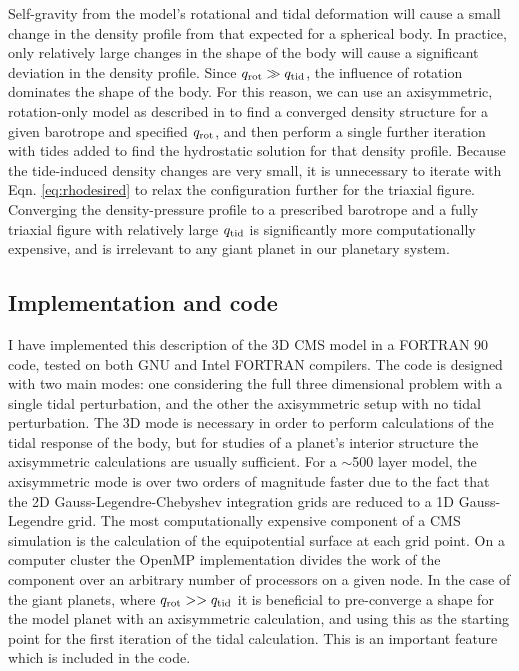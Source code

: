 Self-gravity from the model's rotational and tidal deformation will cause a small
change in the density profile from that expected for a spherical body.  In practice,
only relatively large changes in the shape of the body will cause a significant
deviation in the density profile. Since $q_{\rm rot} \gg q_{\rm tid}$, the influence
of rotation dominates the shape of the body. For this reason, we can use an
axisymmetric, rotation-only model as described in \citet{hubbard2013} to find a
converged density structure for a given barotrope and specified $q_{\rm rot}$, and
then perform a single further iteration with tides added to find the hydrostatic
solution for that density profile.  Because the tide-induced density changes are very
small, it is unnecessary to iterate with Eqn.  \eqref{eq:rhodesired} to relax the
configuration further for the triaxial figure. Converging the density-pressure
profile to a prescribed barotrope and a fully triaxial figure with relatively large
$q_{\rm tid}$ is significantly more computationally expensive, and is irrelevant to
any giant planet in our planetary system.

\subsection{Implementation and code}

I have implemented this description of the 3D CMS model in a FORTRAN 90 code, tested
on both GNU and Intel FORTRAN compilers. The code is designed with two main modes:
one considering the full three dimensional problem with a single tidal perturbation,
and the other the axisymmetric setup with no tidal perturbation. The 3D mode is
necessary in order to perform calculations of the tidal response of the body, but for
studies of a planet's interior structure the axisymmetric calculations are usually
sufficient. For a $\sim$500 layer model, the axisymmetric mode is over two orders of
magnitude faster due to the fact that the 2D Gauss-Legendre-Chebyshev integration
grids are reduced to a 1D Gauss-Legendre grid. The most computationally expensive
component of a CMS simulation is the calculation of the equipotential surface at each
grid point.  On a computer cluster the OpenMP implementation divides the work of the
component over an arbitrary number of processors on a given node. In the case of the
giant planets, where $q_{\rm rot}>>q_{\rm tid}$ it is beneficial to pre-converge a
shape for the model planet with an axisymmetric calculation, and using this as the
starting point for the first iteration of the tidal calculation. This is an important
feature which is included in the code.

